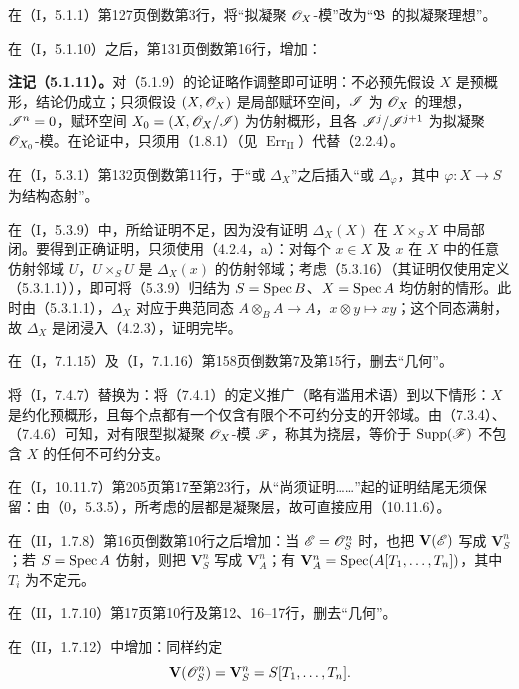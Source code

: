 在（I，5.1.1）第127页倒数第3行，将“拟凝聚 $\mathscr O_X$-模”改为“$\mathfrak B$ 的拟凝聚理想”。

在（I，5.1.10）之后，第131页倒数第16行，增加：

\noindent\textbf{注记（5.1.11）。}对（5.1.9）的论证略作调整即可证明：不必预先假设 $X$ 是预概形，结论仍成立；只须假设 $(X,\mathscr O_X)$ 是局部赋环空间，$\mathscr I$ 为 $\mathscr O_X$ 的理想，$\mathscr I^n=0$，赋环空间 $X_0=(X,\mathscr O_X/\mathscr I)$ 为仿射概形，且各 $\mathscr I^j/\mathscr I^{j+1}$ 为拟凝聚 $\mathscr O_{X_0}$-模。在论证中，只须用（1.8.1）（见 $\operatorname{Err}_{\mathrm{II}}$）代替（2.2.4）。

在（I，5.3.1）第132页倒数第11行，于“或 $\Delta_X$”之后插入“或 $\Delta_\varphi$，其中 $\varphi:X\to S$ 为结构态射”。

在（I，5.3.9）中，所给证明不足，因为没有证明 $\Delta_X(X)$ 在 $X\times_SX$ 中局部闭。要得到正确证明，只须使用（4.2.4，a）：对每个 $x\in X$ 及 $x$ 在 $X$ 中的任意仿射邻域 $U$，$U\times_SU$ 是 $\Delta_X(x)$ 的仿射邻域；考虑（5.3.16）（其证明仅使用定义（5.3.1.1）），即可将（5.3.9）归结为 $S=\operatorname{Spec} B$、$X=\operatorname{Spec} A$ 均仿射的情形。此时由（5.3.1.1），$\Delta_X$ 对应于典范同态 $A\otimes_BA\to A$，$x\otimes y\mapsto xy$；这个同态满射，故 $\Delta_X$ 是闭浸入（4.2.3），证明完毕。

在（I，7.1.15）及（I，7.1.16）第158页倒数第7及第15行，删去“几何”。

将（I，7.4.7）替换为：将（7.4.1）的定义推广（略有滥用术语）到以下情形：$X$ 是约化预概形，且每个点都有一个仅含有限个不可约分支的开邻域。由（7.3.4）、（7.4.6）可知，对有限型拟凝聚 $\mathscr O_X$-模 $\mathscr F$，称其为挠层，等价于 $\operatorname{Supp}(\mathscr F)$ 不包含 $X$ 的任何不可约分支。

在（I，10.11.7）第205页第17至第23行，从“尚须证明……”起的证明结尾无须保留：由（0，5.3.5），所考虑的层都是凝聚层，故可直接应用（10.11.6）。

在（II，1.7.8）第16页倒数第10行之后增加：当 $\mathscr E=\mathscr O_S^n$ 时，也把 $\mathbf V(\mathscr E)$ 写成 $\mathbf V_S^n$；若 $S=\operatorname{Spec} A$ 仿射，则把 $\mathbf V_S^n$ 写成 $\mathbf V_A^n$；有 $\mathbf V_A^n=\operatorname{Spec}(A[T_1,\ldots,T_n])$，其中 $T_i$ 为不定元。

在（II，1.7.10）第17页第10行及第12、16--17行，删去“几何”。

在（II，1.7.12）中增加：同样约定
\[
 \mathbf V(\mathscr O_S^n)=\mathbf V_S^n=S[T_1,\ldots,T_n].
\]

